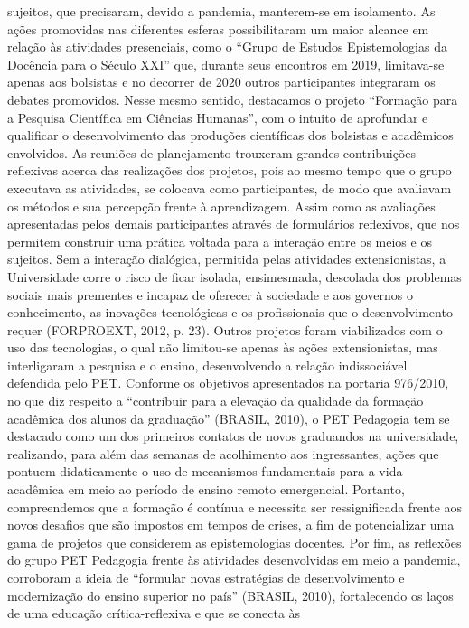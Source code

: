 sujeitos, que precisaram, devido a pandemia, manterem-se em isolamento. As ações promovidas
nas diferentes esferas possibilitaram um maior alcance em relação às atividades presenciais,
como o “Grupo de Estudos Epistemologias da Docência para o Século XXI” que, durante seus
encontros em 2019, limitava-se apenas aos bolsistas e no decorrer de 2020 outros participantes
integraram os debates promovidos. Nesse mesmo sentido, destacamos o projeto “Formação para
a Pesquisa Científica em Ciências Humanas”, com o intuito de aprofundar e qualificar o
desenvolvimento das produções científicas dos bolsistas e acadêmicos envolvidos.
As reuniões de planejamento trouxeram grandes contribuições reflexivas acerca das
realizações dos projetos, pois ao mesmo tempo que o grupo executava as atividades, se colocava
como participantes, de modo que avaliavam os métodos e sua percepção frente à aprendizagem.
Assim como as avaliações apresentadas pelos demais participantes através de formulários
reflexivos, que nos permitem construir uma prática voltada para a interação entre os meios e os
sujeitos.
Sem a interação dialógica, permitida pelas atividades extensionistas, a Universidade
corre o risco de ficar isolada, ensimesmada, descolada dos problemas sociais mais
prementes e incapaz de oferecer à sociedade e aos governos o conhecimento, as
inovações tecnológicas e os profissionais que o desenvolvimento requer (FORPROEXT,
2012, p. 23).
Outros projetos foram viabilizados com o uso das tecnologias, o qual não limitou-se
apenas às ações extensionistas, mas interligaram a pesquisa e o ensino, desenvolvendo a relação
indissociável defendida pelo PET. Conforme os objetivos apresentados na portaria 976/2010, no
que diz respeito a “contribuir para a elevação da qualidade da formação acadêmica dos alunos da
graduação” (BRASIL, 2010), o PET Pedagogia tem se destacado como um dos primeiros
contatos de novos graduandos na universidade, realizando, para além das semanas de
acolhimento aos ingressantes, ações que pontuem didaticamente o uso de mecanismos
fundamentais para a vida acadêmica em meio ao período de ensino remoto emergencial.
Portanto, compreendemos que a formação é contínua e necessita ser ressignificada frente
aos novos desafios que são impostos em tempos de crises, a fim de potencializar uma gama de
projetos que considerem as epistemologias docentes. Por fim, as reflexões do grupo PET
Pedagogia frente às atividades desenvolvidas em meio a pandemia, corroboram a ideia de
“formular novas estratégias de desenvolvimento e modernização do ensino superior no país”
(BRASIL, 2010), fortalecendo os laços de uma educação crítica-reflexiva e que se conecta às
